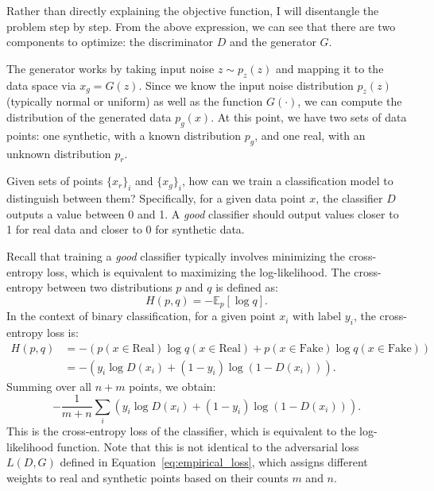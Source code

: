\documentclass[12pt]{article}
\begin{document}
Rather than directly explaining the objective function, I will disentangle the
problem step by step. From the above expression, we can see that there are two
components to optimize: the discriminator \(D\) and the generator \(G\).

The generator works by taking input noise \(z \sim p_z(z)\) and mapping it to
the data space via \(x_g = G(z)\). Since we know the input noise distribution
\(p_z(z)\) (typically normal or uniform) as well as the function \(G(\cdot)\),
we can compute the distribution of the generated data \(p_g(x)\). At this
point, we have two sets of data points: one synthetic, with a known
distribution \(p_g\), and one real, with an unknown distribution \(p_r\).

Given sets of points \(\{x_r\}_i\) and \(\{x_g\}_i\), how can we train a
classification model to distinguish between them? Specifically, for a given
data point \(x\), the classifier \(D\) outputs a value between 0 and 1. A
\textit{good} classifier should output values closer to 1 for real data and
closer to 0 for synthetic data.

Recall that training a \textit{good} classifier typically involves minimizing
the cross-entropy loss, which is equivalent to maximizing the log-likelihood.
The cross-entropy between two distributions \(p\) and \(q\) is defined as:
\begin{equation*}
    H(p, q) = -\mathbb{E}_p[\log q].
\end{equation*}
In the context of binary classification, for a given point \(x_i\) with label \(y_i\), the cross-entropy loss is:
\begin{equation*}
    \begin{split}
        H(p, q) & = - \left( p(x \in \text{Real}) \log q(x \in \text{Real}) + p(x \in \text{Fake}) \log q(x \in \text{Fake}) \right) \\
                & = -\left(y_i \log D(x_i) + (1-y_i) \log (1-D(x_i))\right).
    \end{split}
\end{equation*}
Summing over all \(n + m\) points, we obtain:
\begin{equation*}
    -\frac{1}{m+n}\sum_i \left( y_i \log D(x_i) + (1-y_i) \log (1-D(x_i)) \right).
\end{equation*}
This is the cross-entropy loss of the classifier, which is equivalent to the log-likelihood function. Note that this is not identical to the adversarial loss \(L(D, G)\) defined in Equation~\eqref{eq:empirical_loss}, which assigns different weights to real and synthetic points based on their counts \(m\) and \(n\).
\end{document}
